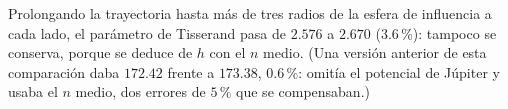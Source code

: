 \documentclass[12pt,letterpaper]{article}
\begin{document}
Prolongando la trayectoria hasta más de tres radios de la esfera de influencia a cada lado, el
parámetro de Tisserand pasa de $2.576$ a $2.670$ ($3.6\,\%$): tampoco se conserva, porque se
deduce de $h$ con el $n$ medio. (Una versión anterior de esta comparación daba $172.42$ frente a
$173.38$, $0.6\,\%$: omitía el potencial de Júpiter y usaba el $n$ medio, dos errores de
$5\,\%$ que se compensaban.)
\end{document}
